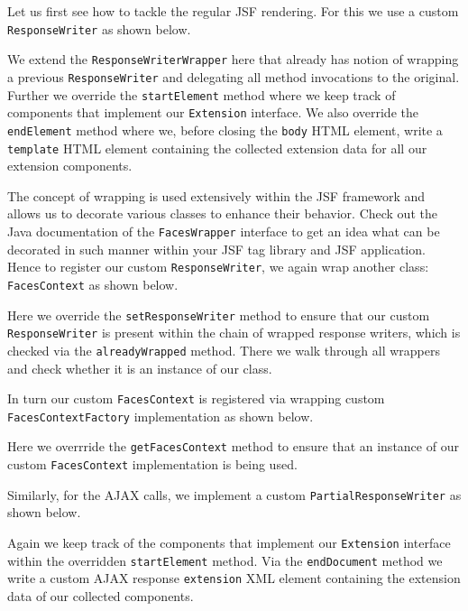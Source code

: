 Let us first see how to tackle the regular JSF rendering.
For this we use a custom \texttt{ResponseWriter} as shown below.

We extend the \texttt{ResponseWriterWrapper} here that already has notion of wrapping a previous \texttt{ResponseWriter} and delegating all method invocations to the original.
Further we override the \texttt{startElement} method where we keep track of components that implement our \texttt{Extension} interface.
We also override the \texttt{endElement} method where we, before closing the \texttt{body} HTML element, write a \texttt{template} HTML element containing the collected extension data for all our extension components.

The concept of wrapping is used extensively within the JSF framework and allows us to decorate various classes to enhance their behavior.
Check out the Java documentation of the \texttt{FacesWrapper} interface to get an idea what can be decorated in such manner within your JSF tag library and JSF application.
Hence to register our custom \texttt{ResponseWriter}, we again wrap another class: \texttt{FacesContext} as shown below.

Here we override the \texttt{setResponseWriter} method to ensure that our custom \texttt{Response\allowbreak Writer} is present within the chain of wrapped response writers, which is checked via the \texttt{already\allowbreak Wrapped} method.
There we walk through all wrappers and check whether it is an instance of our class.

In turn our custom \texttt{FacesContext} is registered via wrapping custom \texttt{FacesContext\allowbreak Factory} implementation as shown below.

Here we overrride the \texttt{getFacesContext} method to ensure that an instance of our custom \texttt{FacesContext} implementation is being used.

Similarly, for the AJAX calls, we implement a custom \texttt{PartialResponseWriter} as shown below.

Again we keep track of the components that implement our \texttt{Extension} interface within the overridden \texttt{startElement} method.
Via the \texttt{endDocument} method we write a custom AJAX response \texttt{extension} XML element containing the extension data of our collected components.

